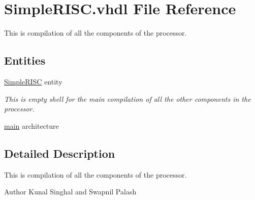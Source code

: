 \hypertarget{_simple_r_i_s_c_8vhdl}{\section{Simple\-R\-I\-S\-C.\-vhdl File Reference}
\label{_simple_r_i_s_c_8vhdl}
}


This is compilation of all the components of the processor.  


\subsection*{Entities}
\begin{DoxyCompactItemize}
\item 
\hyperlink{class_simple_r_i_s_c}{Simple\-R\-I\-S\-C} entity
\begin{DoxyCompactList}\small\item\em This is empty shell for the main compilation of all the other components in the processor. \end{DoxyCompactList}\item 
\hyperlink{class_simple_r_i_s_c_1_1main}{main} architecture
\end{DoxyCompactItemize}


\subsection{Detailed Description}
This is compilation of all the components of the processor. \begin{DoxyAuthor}{Author}
Kunal Singhal and Swapnil Palash 
\end{DoxyAuthor}
